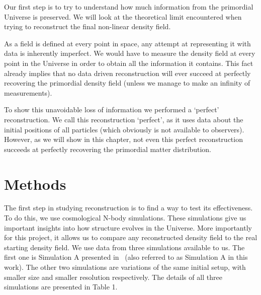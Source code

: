 
Our first step is to try to understand how much information from the primordial Universe is preserved. We will look at the theoretical limit encountered when trying to reconstruct the final non-linear density field. 

As a field is defined at every point in space, any attempt at representing it with data is inherently imperfect. We would have to measure the density field at every point in the Universe in order to obtain all the information it contains. This fact already implies that no data driven reconstruction will ever succeed at perfectly recovering the primordial density field (unless we manage to make an infinity of measurements).

To show this unavoidable loss of information we performed a `perfect' reconstruction. We call this reconstruction `perfect', as it uses data about the initial positions of all particles (which obviously is not available to observers). However, as we will show in this chapter, not even this perfect reconstruction succeeds at perfectly recovering the primordial matter distribution.

\section{Methods}


The first step in studying reconstruction is to find a way to test its effectiveness. To do this, we use cosmological N-body simulations. These simulations give us important insights into how structure evolves in the Universe. More importantly for this project, it allows us to compare any reconstructed density field to the real starting density field. We use data from three simulations available to us. The first one is Simulation A presented in~\cite{Pontzen_paired_simulations} (also referred to as Simulation A in this work). The other two simulations are variations of the same initial setup, with smaller size and smaller resolution respectively. The details of all three simulations are presented in Table 1.

